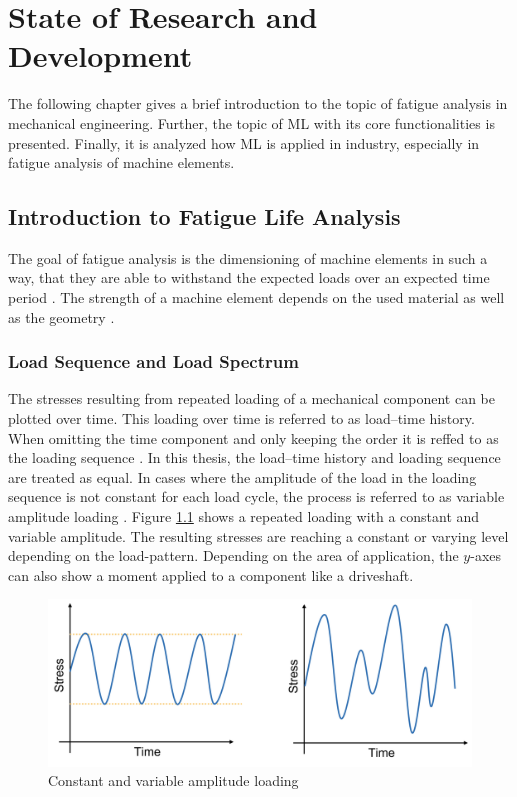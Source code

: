 \chapter{State of Research and Development}
The following chapter gives a brief introduction to the topic of fatigue analysis in mechanical engineering. Further, the topic of ML with its core functionalities is presented. Finally, it is analyzed how ML is applied in industry, especially in fatigue analysis of machine elements.

\section{Introduction to Fatigue Life Analysis}
The goal of fatigue analysis is the dimensioning of machine elements in such a way, that they are able to withstand the expected loads over an expected time period \cite{Haibach}. The strength of a machine element depends on the used material as well as the geometry \cite{Wittel}.

\subsection{Load Sequence and Load Spectrum}
The stresses resulting from repeated loading of a mechanical component can be plotted over time. This loading over time is referred to as load–time history. When omitting the time component and only keeping the order it is reffed to as the loading sequence \cite{HEULER}. In this thesis, the load–time history and loading sequence are treated as equal. In cases where the amplitude of the load in the loading sequence is not constant for each load cycle, the process is referred to as variable amplitude loading \cite{Facchinetti}.
Figure \ref{fig:VAL} shows a repeated loading with a constant and variable amplitude.
The resulting stresses are reaching a constant or varying level depending on the load-pattern. Depending on the area of application, the \(y\)-axes can also show a moment applied to a component like a driveshaft. 

\begin{figure}[H]
	\centering
	\includegraphics[width=0.8\linewidth]{IMGs/loading.png}
	\caption{Constant and variable amplitude loading}
	\label{fig:VAL}
\end{figure}
 

